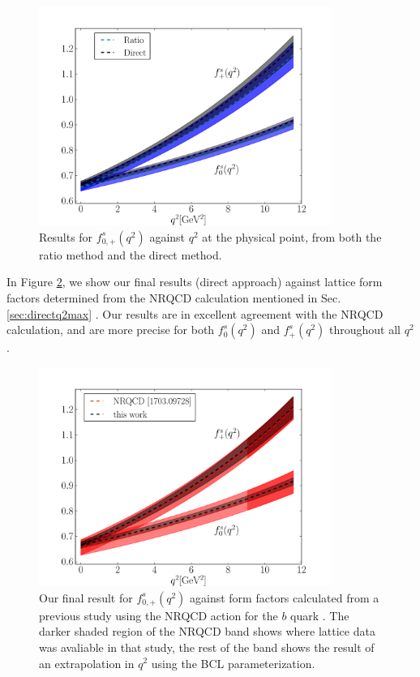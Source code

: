 \begin{figure}[htb!]
  \begin{center}
  \includegraphics[width=0.85\textwidth]{images/BsDs/ratio_vs_direct.pdf}
  \caption{ Results for $f_{0,+}^s(q^2)$ against $q^2$ at the physical point, from both the ratio method and the direct method. \label{fig:ratiovsdirect}}
    \end{center}
\end{figure}

In Figure \ref{fig:nrqcd}, we show our final results (direct approach) against lattice form factors determined from the NRQCD calculation mentioned in Sec. \ref{sec:directq2max} \cite{Monahan:2017uby}. Our results are in excellent agreement with the NRQCD calculation, and are more precise for both $f^s_0(q^2)$ and $f^s_+(q^2)$ throughout all $q^2$.

\begin{figure}[htb!]
\begin{center}
  \includegraphics[width=0.85\textwidth]{images/BsDs/nrqcd_comparison.pdf}
  \caption{ Our final result for $f_{0,+}^s(q^2)$ against form factors calculated from a previous study using the NRQCD action for the $b$ quark  \cite{Monahan:2017uby}. The darker shaded region of the NRQCD band shows where lattice data was avaliable in that study, the rest of the band shows the result of an extrapolation in $q^2$ using the BCL parameterization.\label{fig:nrqcd}}
  \end{center}
\end{figure}

